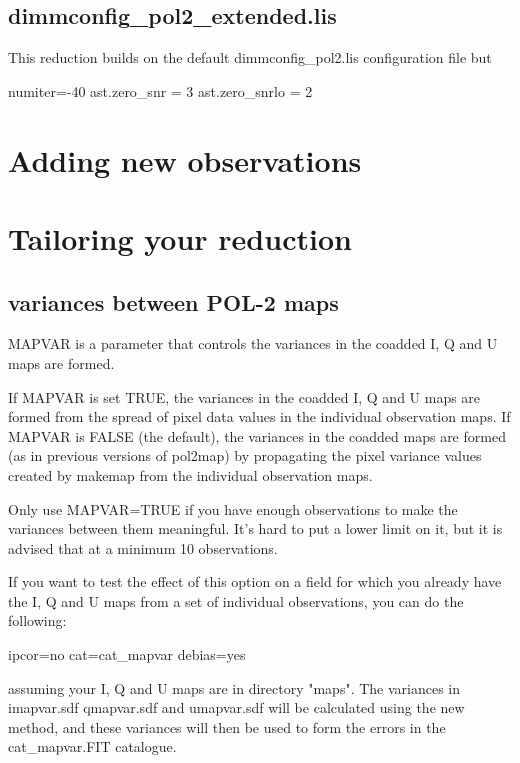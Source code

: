 \subsection{dimmconfig\_pol2\_extended.lis}


This reduction builds on the default dimmconfig\_pol2.lis configuration file but

\begin{terminalv}
   numiter=-40
   ast.zero_snr = 3
   ast.zero_snrlo = 2
\end{terminalv}


\section{Adding new observations}



\section{Tailoring your reduction}

\subsection*{variances between POL-2 maps}

MAPVAR is a parameter that controls the variances in the coadded 
I, Q and U maps are formed.

If  MAPVAR is set TRUE, the variances in the coadded I, Q and U maps
are formed from the spread of pixel data values in the individual
observation maps. If MAPVAR is FALSE (the default), the variances in
the coadded maps are formed (as in previous versions of pol2map) by
propagating the pixel variance values created by makemap from the
individual observation maps.

Only use MAPVAR=TRUE if you have enough observations to
make the variances between them meaningful. It's hard to put a lower
limit on it, but it is advised that at a minimum 10 observations.


If you want to test the effect of this option on a field for which you
already have the I, Q and U maps from a set of individual
observations, you can do the following:

\begin{terminalv}
                   ipcor=no cat=cat_mapvar debias=yes
\end{terminalv}

assuming your I, Q and U maps are in directory "maps". The variances
in imapvar.sdf qmapvar.sdf and umapvar.sdf will be calculated using
the new method, and these variances will then be used to form the
errors in the cat_mapvar.FIT catalogue.



